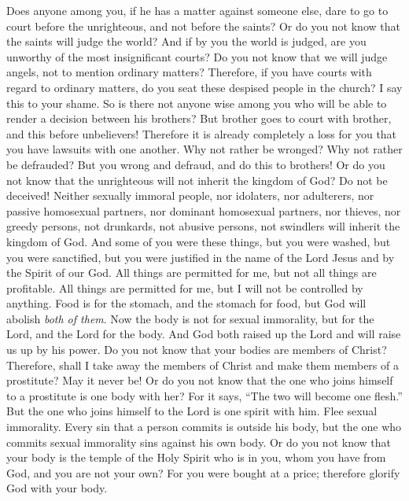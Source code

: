 \begin{biblechapter} %
 Does anyone among you, if he has a matter against someone else, dare to go to court before the unrighteous, and not before the saints?
\verse Or do you not know that the saints will judge the world? And if by you the world is judged, are you unworthy of the most insignificant courts?
\verse Do you not know that we will judge angels, not to mention ordinary matters?
\verse Therefore, if you have courts with regard to ordinary matters, do you seat these despised people in the church?
\verse I say this to your shame. So is there not anyone wise among you who will be able to render a decision between his brothers?
\verse But brother goes to court with brother, and this before unbelievers!
\verse Therefore it is already completely a loss for you that you have lawsuits with one another. Why not rather be wronged? Why not rather be defrauded?
\verse But you wrong and defraud, and do this to brothers!
\verse Or do you not know that the unrighteous will not inherit the kingdom of God? Do not be deceived! Neither sexually immoral people, nor idolaters, nor adulterers, nor passive homosexual partners, nor dominant homosexual partners,
\verse nor thieves, nor greedy persons, not drunkards, not abusive persons, not swindlers will inherit the kingdom of God.
\verse And some of you were these things, but you were washed, but you were sanctified, but you were justified in the name of the Lord Jesus and by the Spirit of our God.
 All things are permitted for me, but not all things are profitable. All things are permitted for me, but I will not be controlled by anything.
\verse Food is for the stomach, and the stomach for food, but God will abolish \textit{both of them}. Now the body is not for sexual immorality, but for the Lord, and the Lord for the body.
\verse And God both raised up the Lord and will raise us up by his power.
\verse Do you not know that your bodies are members of Christ? Therefore, shall I take away the members of Christ and make them members of a prostitute? May it never be!
\verse Or do you not know that the one who joins himself to a prostitute is one body with her? For it says, “The two will become one flesh.”
\verse But the one who joins himself to the Lord is one spirit with him.
\verse Flee sexual immorality. Every sin that a person commits is outside his body, but the one who commits sexual immorality sins against his own body.
\verse Or do you not know that your body is the temple of the Holy Spirit who is in you, whom you have from God, and you are not your own?
\verse For you were bought at a price; therefore glorify God with your body.
\end{biblechapter}

